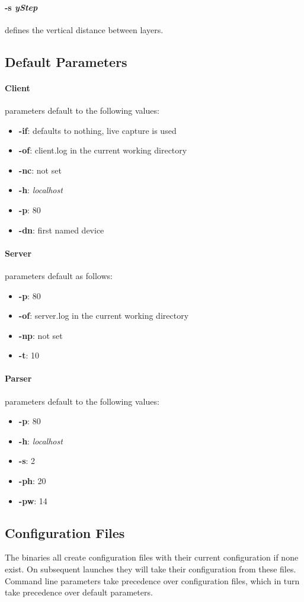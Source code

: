 \paragraph{-s \textit{yStep}} defines the vertical distance between layers.

\subsection*{Default Parameters}
\paragraph{Client} parameters default to the following values:
\begin{itemize}
    \item \textbf{-if}: defaults to nothing, live capture is used
    \item \textbf{-of}: client.log in the current working directory
    \item \textbf{-nc}: not set
    \item \textbf{-h}: \textit{localhost}
    \item \textbf{-p}: 80
    \item \textbf{-dn}: first named device
\end{itemize}

\paragraph{Server} parameters default as follows:
\begin{itemize}
    \item \textbf{-p}: 80
    \item \textbf{-of}: server.log in the current working directory
    \item \textbf{-np}: not set
    \item \textbf{-t}: 10
\end{itemize}

\paragraph{Parser} parameters default to the following values:
\begin{itemize}
    \item \textbf{-p}: 80
    \item \textbf{-h}: \textit{localhost}
    \item \textbf{-s}: 2
    \item \textbf{-ph}: 20
    \item \textbf{-pw}: 14
\end{itemize}

\subsection*{Configuration Files}
The binaries all create configuration files with their current configuration if none exist.
On subsequent launches they will take their configuration from these files.
Command line parameters take precedence over configuration files, which in turn take precedence over default parameters.

